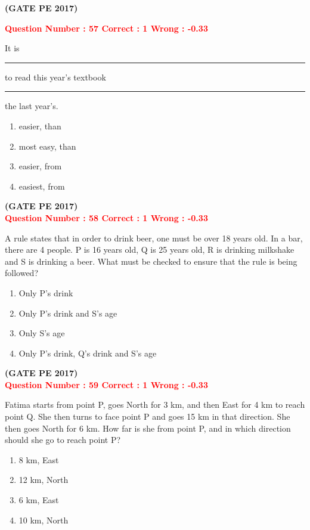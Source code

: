 \documentclass[journal,12pt,onecolumn]{article}
\begin{document}
{\hfill\textbf{(GATE PE 2017)}\\[0.6cm]

\newpage


\textcolor{red}{\textbf{Question Number : 57 \hfill Correct : 1  Wrong : -0.33}}


It is \rule{2cm}{0.4pt} to read this year’s textbook \rule{2cm}{0.4pt} the last year’s.

\begin{enumerate}[label=(\Alph*)]
    \item easier, than
    \item most easy, than
    \item easier, from
    \item easiest, from
\end{enumerate}

\hfill\textbf{(GATE PE 2017)}\\[0.6cm]


\textcolor{red}{\textbf{Question Number : 58 \hfill Correct : 1  Wrong : -0.33}}


A rule states that in order to drink beer, one must be over 18 years old. In a bar, there are 4 people. P is 16 years old, Q is 25 years old, R is drinking milkshake and S is drinking a beer. What must be checked to ensure that the rule is being followed?

\begin{enumerate}[label=(\Alph*)]
    \item Only P’s drink
    \item Only P’s drink and S’s age
    \item Only S’s age
    \item Only P’s drink, Q’s drink and S’s age
\end{enumerate}

\hfill\textbf{(GATE PE 2017)}\\[0.6cm]

\textcolor{red}{\textbf{Question Number : 59 \hfill Correct : 1  Wrong : -0.33}}


Fatima starts from point P, goes North for 3 km, and then East for 4 km to reach point Q. She then turns to face point P and goes 15 km in that direction. She then goes North for 6 km. How far is she from point P, and in which direction should she go to reach point P?

\begin{enumerate}[label=(\Alph*)]
    \item 8 km, East
    \item 12 km, North
    \item 6 km, East
    \item 10 km, North
\end{enumerate}

}
\end{document}
